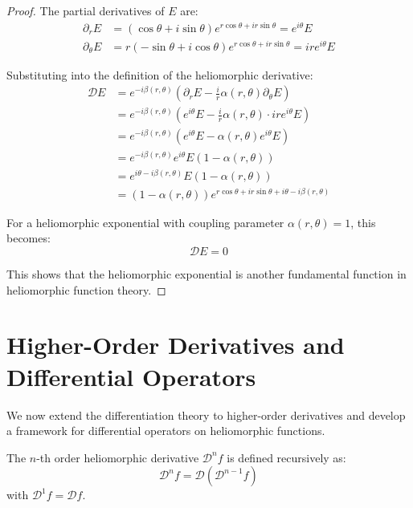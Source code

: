 \begin{proof}
The partial derivatives of $E$ are:
\begin{align}
\partial_rE &= (\cos\theta + i\sin\theta)e^{r\cos\theta + ir\sin\theta} = e^{i\theta}E\\
\partial_\theta E &= r(-\sin\theta + i\cos\theta)e^{r\cos\theta + ir\sin\theta} = ire^{i\theta}E
\end{align}

Substituting into the definition of the heliomorphic derivative:
\begin{align}
\mathcal{D}E &= e^{-i\beta(r,\theta)}\left(\partial_rE - \frac{i}{r}\alpha(r,\theta)\partial_\theta E\right)\\
&= e^{-i\beta(r,\theta)}\left(e^{i\theta}E - \frac{i}{r}\alpha(r,\theta) \cdot ire^{i\theta}E\right)\\
&= e^{-i\beta(r,\theta)}\left(e^{i\theta}E - \alpha(r,\theta)e^{i\theta}E\right)\\
&= e^{-i\beta(r,\theta)}e^{i\theta}E(1 - \alpha(r,\theta))\\
&= e^{i\theta - i\beta(r,\theta)}E(1 - \alpha(r,\theta))\\
&= \left(1 - \alpha(r,\theta)\right)e^{r\cos\theta + ir\sin\theta + i\theta - i\beta(r,\theta)}
\end{align}

For a heliomorphic exponential with coupling parameter $\alpha(r,\theta) = 1$, this becomes:
\begin{equation}
\mathcal{D}E = 0
\end{equation}

This shows that the heliomorphic exponential is another fundamental function in heliomorphic function theory.
\end{proof}

\section{Higher-Order Derivatives and Differential Operators}

We now extend the differentiation theory to higher-order derivatives and develop a framework for differential operators on heliomorphic functions.

\begin{definition}
The $n$-th order heliomorphic derivative $\mathcal{D}^nf$ is defined recursively as:
\begin{equation}
\mathcal{D}^nf = \mathcal{D}(\mathcal{D}^{n-1}f)
\end{equation}
with $\mathcal{D}^1f = \mathcal{D}f$.
\end{definition}

